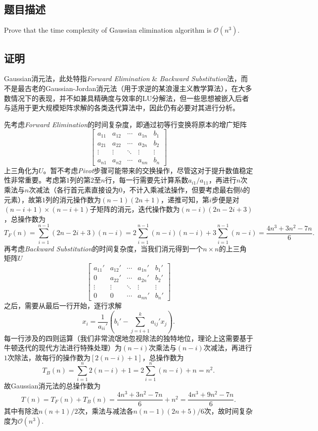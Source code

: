 \subsection{题目描述}
Prove that the time complexity of Gaussian elimination algorithm is $\mathcal{O}(n^3)$.
\subsection{证明}
Gaussian消元法，此处特指\textit{Forward Elimination} \& \textit{Backward Substitution}法，而不是最古老的Gaussian-Jordan消元法（用于求逆的某浪漫主义教学算法），在大多数情况下的表现，并不如兼具精确度与效率的LU分解法，但一些思想被嵌入后者与适用于更大规模矩阵求解的各类迭代算法中，因此仍有必要对其进行分析。


先考虑\textit{Forward Elimination}的时间复杂度，即通过初等行变换将原本的增广矩阵
\[
	\left[\begin{array}{cccc|c}a_{11}&a_{12}&\cdots&a_{1n}&b_{1}\\a_{21}&a_{22}&\cdots&a_{2n}&b_{2}\\\vdots&\vdots&\ddots&\vdots&\vdots\\a_{n 1}&a_{n 2}&\cdots&a_{n n}&b_{n}\end{array}\right]
\]
上三角化为$U$。暂不考虑\textit{Pivot}步骤可能带来的交换操作，尽管这对于提升数值稳定性非常重要。考虑第$1$列的第$2$至$n$行，每一行需要先计算系数$a_{i1}/a_{11}$，再进行$n$次乘法与$n$次减法（各行首元素直接设为$0$，不计入乘减法操作，但要考虑最右侧$b$的元素），故第$1$列的消元操作数为$(n-1)(2n+1)$，递推可知，第$i$步便是对$(n-i+1)\times(n-i+1)$子矩阵的消元，迭代操作数为$(n-i)(2n-2i+3)$，总操作数为
\[
	T_F(n) =
	\sum_{i=1}^{n-1} (2n-2i+3)(n-i) = 2\sum_{i=1}^{n-1} (n-i)(n-i)+3\sum_{i=1}^{n-1} (n-i) = \frac{4n^3+3n^2-7n}{6}.
\]
再考虑\textit{Backward Substitution}的时间复杂度，当我们消元得到一个$n \times n$的上三角矩阵$U$
\[
	\left[\begin{array}{cccc|c}a_{11}'&a_{12}'&\cdots&a_{1 n}'&b_{1}'\\0&a_{22}'&\cdots&a_{2 n}'&b_{2}'\\\vdots&\vdots&\ddots&\vdots&\vdots\\0&0&\cdots&a_{n n}'&b_{n}'\end{array}\right]
\]
之后，需要从最后一行开始，逐行求解
\[
	x_i=\frac{1}{a_{i i}'}\left(b_i'-\sum_{j=i+1}^ka_{i j}' x_j\right).
\]
每一行涉及的四则运算（我们非常流氓地忽视除法的独特地位，理论上这需要基于牛顿迭代的现代方法进行特殊处理）为$(n-i)$次乘法与$(n-i)$次减法，再进行$1$次除法，故每行的操作数为$[2(n-i)+1]$，总操作数为
\[
	T_B(n)=\sum_{i=1}^n 2(n-i)+1=2\sum_{i=1}^n (n-i)+n=n^2.
\]
故Gaussian消元法的总操作数为
\[
	T(n)=T_F(n)+T_B(n)=\frac{4n^3+3n^2-7n}{6}+n^2=\frac{4n^3+9n^2-7n}{6}.
\]
其中有除法$n(n+1)/2$次，乘法与减法各$n(n-1)(2n+5)/6$次，故时间复杂度为$\mathcal{O}(n^3)$.

